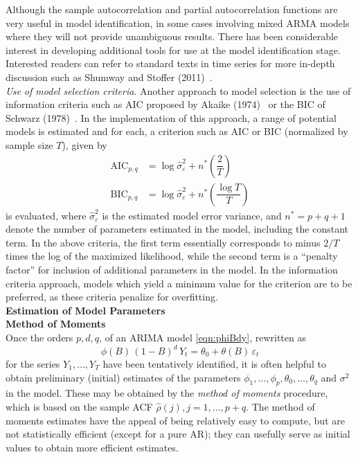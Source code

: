 Although the sample autocorrelation and partial autocorrelation functions are very useful in model identification, in some cases involving mixed ARMA models where they will not provide unambiguous results. There has been considerable interest in developing additional tools for use at the model identification stage. Interested readers can refer to standard texts in time series for more in-depth discussion such as Shumway and Stoffer (2011)~\cite{shumway2011arima}. \\


\noindent\emph{Use of model selection criteria}. Another approach to model selection is the use of information criteria such as AIC proposed by Akaike (1974)~\cite{akaike74} or the BIC of Schwarz (1978)~\cite{sch78}. In the implementation of this approach, a range of potential models is estimated and for each, a criterion such as AIC or BIC (normalized by sample size $T$), given by
	\begin{equation} \label{eqn:aicbic}
	\begin{split}
	\text{AIC}_{p,q}&= \log \hat{\sigma}_\varepsilon^2 + n^* \left( \dfrac{2}{T} \right) \\
	\text{BIC}_{p,q}&=\log\hat{\sigma}_\varepsilon^2 + n^* \left( \dfrac{\log T}{T} \right)
	\end{split}
	\end{equation}
is evaluated, where $\hat{\sigma}_\varepsilon^2$ is the estimated model error variance, and $n^*= p + q + 1$ denote the number of parameters estimated in the model, including the constant term. In the above criteria, the first term essentially corresponds to minus $2/T$ times the log of the maximized likelihood, while the second term is a ``penalty factor'' for inclusion of additional parameters in the model. In the information criteria approach, models which yield a minimum value for the criterion are to be preferred, as these criteria penalize for overfitting. \\


{\noindent\bfseries\large Estimation of Model Parameters} \\

\noindent \textbf{Method of Moments} \\


Once the orders $p,d,q$, of an ARIMA model \eqref{eqn:phiBdy}, rewritten as 
	\begin{equation} \label{eqn:phiB}
	\phi(B) \, (1 - B)^d \, Y_t = \theta_0 + \theta(B) \, \varepsilon_t
	\end{equation}
for the series $Y_1, \ldots, Y_T$ have been tentatively identified, it is often helpful to obtain preliminary (initial) estimates of the parameters $\phi_1, \ldots, \phi_p, \theta_0, \ldots, \theta_q$ and $\sigma^2$ in the model. These may be obtained by the \textit{method of moments} procedure, which is based on the sample ACF $\hat{\rho}(j), j= 1, \ldots,  p+q$. The method of moments estimates have the appeal of being relatively easy to compute, but are not statistically efficient (except for a pure AR); they can usefully serve as initial values to obtain more efficient estimates.


